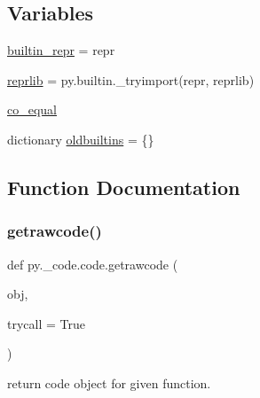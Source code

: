 \subsection*{Variables}
\begin{DoxyCompactItemize}
\item 
\hyperlink{namespacepy_1_1__code_1_1code_a8b110de86e73716ee564f8b84b462b30}{builtin\+\_\+repr} = repr
\item 
\hyperlink{namespacepy_1_1__code_1_1code_a380bb8eed21da20c4e4104a05947e230}{reprlib} = py.\+builtin.\+\_\+tryimport(\textquotesingle{}repr\textquotesingle{}, \textquotesingle{}reprlib\textquotesingle{})
\item 
\hyperlink{namespacepy_1_1__code_1_1code_ac976a81ad3d6cdd1f763d01c3b0b8fac}{co\+\_\+equal}
\item 
dictionary \hyperlink{namespacepy_1_1__code_1_1code_a7b0c58e407c3259902dd6ab9b9940514}{oldbuiltins} = \{\}
\end{DoxyCompactItemize}


\subsection{Function Documentation}
\mbox{\label{namespacepy_1_1__code_1_1code_a3449e9c1a814b60ade9be91f59b524ca}} 
\subsubsection{\texorpdfstring{getrawcode()}{getrawcode()}}
{\footnotesize\ttfamily def py.\+\_\+code.\+code.\+getrawcode (\begin{DoxyParamCaption}\item[{}]{obj,  }\item[{}]{trycall = {\ttfamily True} }\end{DoxyParamCaption})}

\begin{DoxyVerb}return code object for given function. \end{DoxyVerb}
 \mbox{\label{namespacepy_1_1__code_1_1code_af43bd7196e3fba2c867062cd9e55f81d}} 
